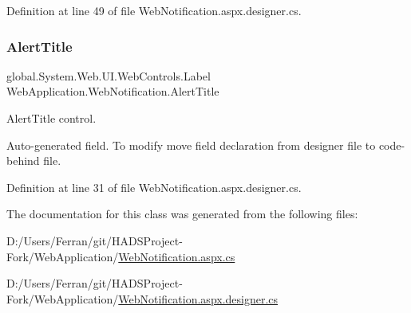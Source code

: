 Definition at line 49 of file Web\+Notification.\+aspx.\+designer.\+cs.

\mbox{\label{classWebApplication_1_1WebNotification_ae5e61b002ffea74359abf68c0ec09d7e}} 
\subsubsection{\texorpdfstring{AlertTitle}{AlertTitle}}
{\footnotesize\ttfamily global.\+System.\+Web.\+U\+I.\+Web\+Controls.\+Label Web\+Application.\+Web\+Notification.\+Alert\+Title\hspace{0.3cm}{\ttfamily [protected]}}



Alert\+Title control. 

Auto-\/generated field. To modify move field declaration from designer file to code-\/behind file. 

Definition at line 31 of file Web\+Notification.\+aspx.\+designer.\+cs.



The documentation for this class was generated from the following files\+:\begin{DoxyCompactItemize}
\item 
D\+:/\+Users/\+Ferran/git/\+H\+A\+D\+S\+Project-\/\+Fork/\+Web\+Application/\mbox{\hyperlink{WebNotification_8aspx_8cs}{Web\+Notification.\+aspx.\+cs}}\item 
D\+:/\+Users/\+Ferran/git/\+H\+A\+D\+S\+Project-\/\+Fork/\+Web\+Application/\mbox{\hyperlink{WebNotification_8aspx_8designer_8cs}{Web\+Notification.\+aspx.\+designer.\+cs}}\end{DoxyCompactItemize}
